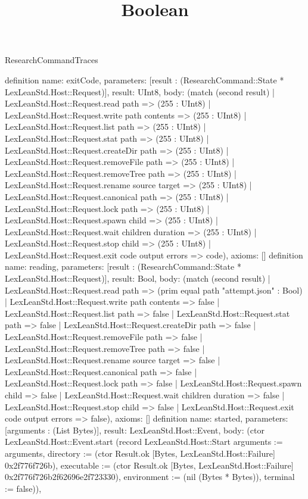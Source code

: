 \begin{lexlean}{ResearchCommandTraces}
\title{Boolean}
\begin{semanticmodule}
definition{
 name: exitCode,
 parameters: [result : (ResearchCommand::State * LexLeanStd.Host::Request)],
 result: UInt8,
 body: (match (second result) | LexLeanStd.Host::Request.read path => (255 : UInt8) | LexLeanStd.Host::Request.write path contents => (255 : UInt8) | LexLeanStd.Host::Request.list path => (255 : UInt8) | LexLeanStd.Host::Request.stat path => (255 : UInt8) | LexLeanStd.Host::Request.createDir path => (255 : UInt8) | LexLeanStd.Host::Request.removeFile path => (255 : UInt8) | LexLeanStd.Host::Request.removeTree path => (255 : UInt8) | LexLeanStd.Host::Request.rename source target => (255 : UInt8) | LexLeanStd.Host::Request.canonical path => (255 : UInt8) | LexLeanStd.Host::Request.lock path => (255 : UInt8) | LexLeanStd.Host::Request.spawn child => (255 : UInt8) | LexLeanStd.Host::Request.wait children duration => (255 : UInt8) | LexLeanStd.Host::Request.stop child => (255 : UInt8) | LexLeanStd.Host::Request.exit code output errors => code),
 axioms: []
}
definition{
 name: reading,
 parameters: [result : (ResearchCommand::State * LexLeanStd.Host::Request)],
 result: Bool,
 body: (match (second result) | LexLeanStd.Host::Request.read path => (prim equal path "attempt.json" : Bool) | LexLeanStd.Host::Request.write path contents => false | LexLeanStd.Host::Request.list path => false | LexLeanStd.Host::Request.stat path => false | LexLeanStd.Host::Request.createDir path => false | LexLeanStd.Host::Request.removeFile path => false | LexLeanStd.Host::Request.removeTree path => false | LexLeanStd.Host::Request.rename source target => false | LexLeanStd.Host::Request.canonical path => false | LexLeanStd.Host::Request.lock path => false | LexLeanStd.Host::Request.spawn child => false | LexLeanStd.Host::Request.wait children duration => false | LexLeanStd.Host::Request.stop child => false | LexLeanStd.Host::Request.exit code output errors => false),
 axioms: []
}
definition{
 name: started,
 parameters: [arguments : (List Bytes)],
 result: LexLeanStd.Host::Event,
 body: (ctor LexLeanStd.Host::Event.start (record LexLeanStd.Host::Start {arguments := arguments, directory := (ctor Result.ok [Bytes, LexLeanStd.Host::Failure] 0x2f776f726b), executable := (ctor Result.ok [Bytes, LexLeanStd.Host::Failure] 0x2f776f726b2f62696e2f723330), environment := (nil (Bytes * Bytes)), terminal := false})),
}
\end{semanticmodule}
\end{lexlean}
